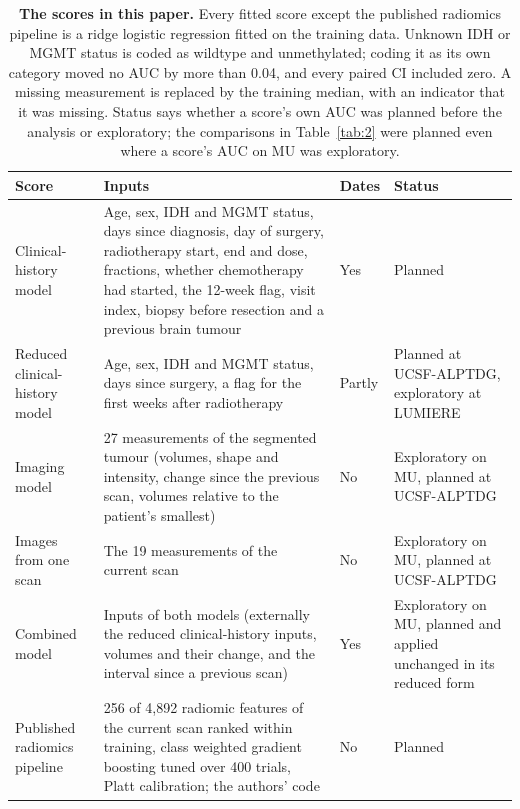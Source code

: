 \begin{table}[!htbp]
\centering
\caption[The scores in this paper]{\textbf{The scores in this paper.} Every fitted score except the published
radiomics pipeline is a ridge logistic regression fitted on the training data. Unknown IDH or MGMT status is coded as
wildtype and unmethylated; coding it as its own category moved no AUC by more than 0.04, and every paired CI included
zero. A missing measurement is replaced by the training median, with an indicator that it was missing. Status says
whether a score's own AUC was planned before the analysis or exploratory; the comparisons in Table~\ref{tab:2} were
planned even where a score's AUC on MU was exploratory.}
\label{tab:models}
\footnotesize
\zebrarows
\begin{tabularx}{\linewidth}{@{}R{2.9cm}LR{1.3cm}R{3.4cm}@{}}
\toprule
Score & Inputs & Dates & Status \\
\midrule
Clinical-history model & Age, sex, IDH and MGMT status, days since diagnosis, day of surgery, radiotherapy start, end and dose, fractions, whether chemotherapy had started, the 12-week flag, visit index, biopsy before resection and a previous brain tumour & Yes & Planned \\
Reduced clinical-history model & Age, sex, IDH and MGMT status, days since surgery, a flag for the first weeks after radiotherapy & Partly & Planned at UCSF-ALPTDG, exploratory at LUMIERE \\
Imaging model & 27 measurements of the segmented tumour (volumes, shape and intensity, change since the previous scan, volumes relative to the patient's smallest) & No & Exploratory on MU, planned at UCSF-ALPTDG \\
Images from one scan & The 19 measurements of the current scan & No & Exploratory on MU, planned at UCSF-ALPTDG \\
Combined model & Inputs of both models (externally the reduced clinical-history inputs, volumes and their change, and the interval since a previous scan) & Yes & Exploratory on MU, planned and applied unchanged in its reduced form \\
\addlinespace
Published radiomics pipeline & 256 of 4,892 radiomic features of the current scan ranked within training, class weighted gradient boosting tuned over 400 trials, Platt calibration; the authors' code \citep{christodoulou2026} & No & Planned \\

\end{tabularx}
\end{table}
